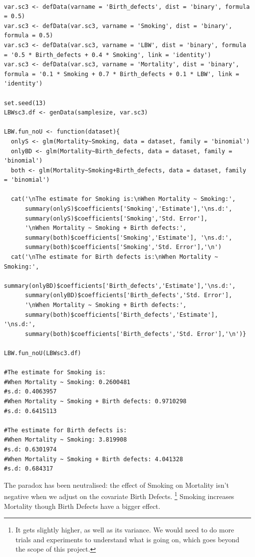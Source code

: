 \documentclass{article}
\begin{document}
\begin{lstlisting}

var.sc3 <- defData(varname = 'Birth_defects', dist = 'binary', formula = 0.5)
var.sc3 <- defData(var.sc3, varname = 'Smoking', dist = 'binary', formula = 0.5)
var.sc3 <- defData(var.sc3, varname = 'LBW', dist = 'binary', formula = '0.5 * Birth_defects + 0.4 * Smoking', link = 'identity')
var.sc3 <- defData(var.sc3, varname = 'Mortality', dist = 'binary', formula = '0.1 * Smoking + 0.7 * Birth_defects + 0.1 * LBW', link = 'identity')

set.seed(13)
LBWsc3.df <- genData(samplesize, var.sc3)

LBW.fun_noU <- function(dataset){
  onlyS <- glm(Mortality~Smoking, data = dataset, family = 'binomial')
  onlyBD <- glm(Mortality~Birth_defects, data = dataset, family = 'binomial')
  both <- glm(Mortality~Smoking+Birth_defects, data = dataset, family = 'binomial')
  
  cat('\nThe estimate for Smoking is:\nWhen Mortality ~ Smoking:', 
      summary(onlyS)$coefficients['Smoking','Estimate'],'\ns.d:', 
      summary(onlyS)$coefficients['Smoking','Std. Error'],
      '\nWhen Mortality ~ Smoking + Birth defects:', 
      summary(both)$coefficients['Smoking','Estimate'], '\ns.d:', 
      summary(both)$coefficients['Smoking','Std. Error'],'\n')
  cat('\nThe estimate for Birth defects is:\nWhen Mortality ~ Smoking:', 
      summary(onlyBD)$coefficients['Birth_defects','Estimate'],'\ns.d:', 
      summary(onlyBD)$coefficients['Birth_defects','Std. Error'],
      '\nWhen Mortality ~ Smoking + Birth defects:', 
      summary(both)$coefficients['Birth_defects','Estimate'], '\ns.d:', 
      summary(both)$coefficients['Birth_defects','Std. Error'],'\n')}

LBW.fun_noU(LBWsc3.df)

#The estimate for Smoking is:
#When Mortality ~ Smoking: 0.2600481 
#s.d: 0.4063957 
#When Mortality ~ Smoking + Birth defects: 0.9710298 
#s.d: 0.6415113 

#The estimate for Birth defects is:
#When Mortality ~ Smoking: 3.819908 
#s.d: 0.6301974 
#When Mortality ~ Smoking + Birth defects: 4.041328 
#s.d: 0.684317 
\end{lstlisting}
The paradox has been neutralised: the effect of Smoking on Mortality isn't negative when we adjust on the covariate Birth Defects. \footnote{It gets slightly higher, as well as its variance. We would need to do more trials and experiments to understand what is going on, which goes beyond the scope of this project.} Smoking increases Mortality though Birth Defects have a bigger effect.
\newpage
\end{document}
